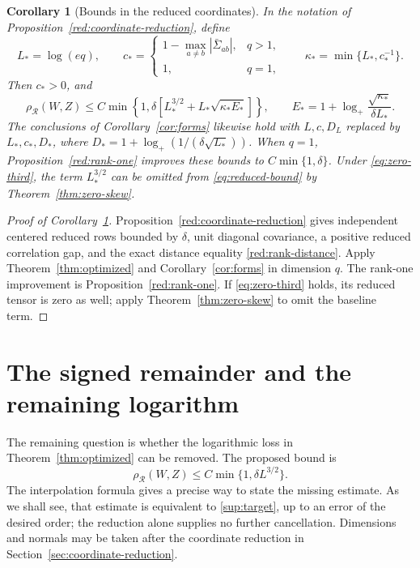 \documentclass[11pt,a4paper]{article}
\newtheorem{corollary}{Corollary}
\theoremstyle{remark}
\newcommand{\rh}{\rho_{\mathcal R}}
\begin{document}
\begin{corollary}[Bounds in the reduced coordinates]\label{cor:reduced}
In the notation of Proposition~\ref{red:coordinate-reduction}, define
\[
 L_*=\log(eq),\qquad
 c_*=\begin{cases}
 1-\max_{a\ne b}|\bar\Sigma_{ab}|,&q>1,\\
 1,&q=1,
 \end{cases}
 \qquad \kappa_*=\min\{L_*,c_*^{-1}\}.
\]
Then \(c_*>0\), and
\begin{equation}
 \rh(W,Z)\le C\min\!\left\{1,
 \delta\left[L_*^{3/2}+L_*\sqrt{\kappa_*E_*}\right]\right\},
 \qquad E_*=1+\log_+\frac{\sqrt{\kappa_*}}{\delta L_*}.
 \label{eq:reduced-bound}
\end{equation}
The conclusions of Corollary~\ref{cor:forms} likewise hold with
\(L,c,D_L\) replaced by \(L_*,c_*,D_*\), where
\(D_*=1+\log_+(1/(\delta\sqrt{L_*}))\).
When \(q=1\), Proposition~\ref{red:rank-one} improves these bounds to
\(C\min\{1,\delta\}\).
Under \eqref{eq:zero-third}, the term \(L_*^{3/2}\) can be omitted
from \eqref{eq:reduced-bound} by Theorem~\ref{thm:zero-skew}.
\end{corollary}

\begin{proof}[Proof of Corollary~\ref{cor:reduced}]
Proposition~\ref{red:coordinate-reduction} gives independent centered
reduced rows bounded by \(\delta\), unit diagonal covariance, a positive
reduced correlation gap, and the exact distance equality
\eqref{red:rank-distance}. Apply Theorem~\ref{thm:optimized} and
Corollary~\ref{cor:forms} in dimension \(q\).
The rank-one improvement is Proposition~\ref{red:rank-one}.
If \eqref{eq:zero-third} holds, its reduced tensor is zero as well;
apply Theorem~\ref{thm:zero-skew} to omit the baseline term.
\end{proof}



\section{The signed remainder and the remaining logarithm}
\label{sup:status}

The remaining question is whether the logarithmic loss in
Theorem~\ref{thm:optimized} can be removed. The proposed bound is
\begin{equation}
 \rh(W,Z)\le C\min\{1,\delta L^{3/2}\}.
 \tag{T}\label{sup:target}
\end{equation}
The interpolation formula gives a precise way to state the missing
estimate. As we shall see, that estimate is equivalent to
\eqref{sup:target}, up to an error of the desired order; the reduction
alone supplies no further cancellation. Dimensions and normals may be
taken after the coordinate reduction in
Section~\ref{sec:coordinate-reduction}.
\end{document}
